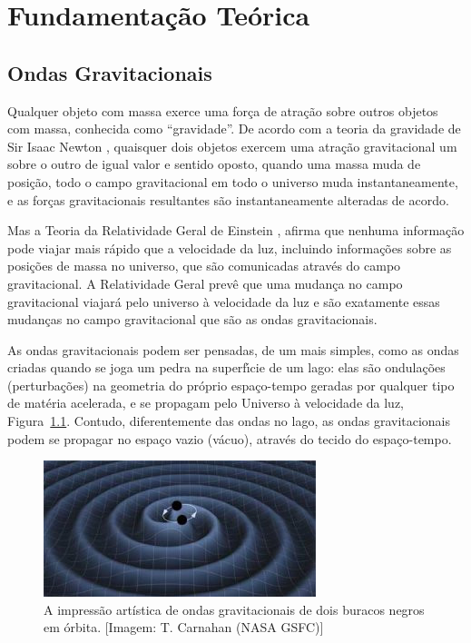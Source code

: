 \chapter{Fundamentação Teórica}
\section{Ondas Gravitacionais}

Qualquer objeto com massa exerce uma força de atração sobre outros objetos com massa, conhecida como “gravidade”. De acordo com a teoria da gravidade de Sir Isaac Newton \cite{newton1687philosophiae}, quaisquer dois objetos exercem uma atração gravitacional um sobre o outro de igual valor e sentido oposto, quando uma massa muda de posição, todo o campo gravitacional em todo o universo muda instantaneamente, e as forças gravitacionais resultantes são instantaneamente alteradas de acordo.

Mas a Teoria da Relatividade Geral de Einstein \cite{albert1920realtivity}, afirma que nenhuma informação pode viajar mais rápido que a velocidade da luz, incluindo informações sobre as posições de massa no universo, que são comunicadas através do campo gravitacional. A Relatividade Geral prevê que uma mudança no campo gravitacional viajará pelo universo à velocidade da luz e são exatamente essas mudanças no campo gravitacional que são as ondas gravitacionais.

As ondas gravitacionais podem ser pensadas, de um mais simples, como as ondas criadas quando se joga um pedra na superfı́cie de um lago: elas são ondulações (perturbações) na geometria do próprio espaço-tempo geradas por qualquer tipo de matéria acelerada, e se propagam pelo Universo à velocidade da luz, Figura~\ref{fig:space-time}. Contudo, diferentemente das ondas no lago, as ondas gravitacionais podem se propagar no espaço vazio (vácuo), através do tecido do espaço-tempo.

\begin{figure}[ht]
\centering
\includegraphics[width=.9\textwidth]{figuras/binary-wave_tn.jpg}
\caption{A impressão artística de ondas gravitacionais de dois buracos negros em órbita. [Imagem: T. Carnahan (NASA GSFC)]}
\label{fig:space-time}
\end{figure}

